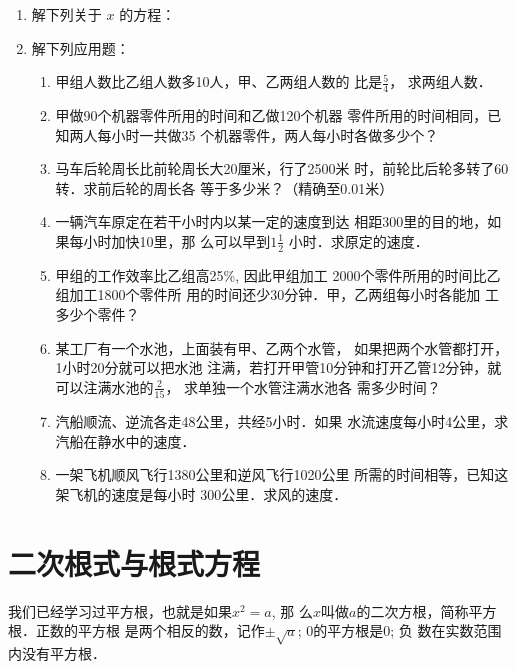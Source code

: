 \begin{enumerate}
\item 解下列关于 $x$ 的方程：
\begin{enumerate}
\end{enumerate}

\item 解下列应用题：
\begin{enumerate}
\item 甲组人数比乙组人数多10人，甲、乙两组人数的
比是$\frac{5}{4}$，
求两组人数．
\item 甲做90个机器零件所用的时间和乙做120个机器
零件所用的时间相同，已知两人每小时一共做35
个机器零件，两人每小时各做多少个？
\item 马车后轮周长比前轮周长大20厘米，行了2500米
时，前轮比后轮多转了60转．求前后轮的周长各
等于多少米？（精确至0.01米）
\item 一辆汽车原定在若干小时内以某一定的速度到达
相距300里的目的地，如果每小时加快10里，那
么可以早到$1\frac{1}{2}$
小时．求原定的速度．
\item 甲组的工作效率比乙组高25\%, 因此甲组加工
2000个零件所用的时间比乙组加工1800个零件所
用的时间还少30分钟．甲，乙两组每小时各能加
工多少个零件？
\item 某工厂有一个水池，上面装有甲、乙两个水管，
如果把两个水管都打开，1小时20分就可以把水池
注满，若打开甲管10分钟和打开乙管12分钟，就
可以注满水池的$\frac{2}{15}$，
求单独一个水管注满水池各
需多少时间？
\item 汽船顺流、逆流各走48公里，共经5小时．如果
水流速度每小时4公里，求汽船在静水中的速度．
\item 一架飞机顺风飞行1380公里和逆风飞行1020公里
所需的时间相等，已知这架飞机的速度是每小时
300公里．求风的速度．
\end{enumerate}
\end{enumerate}

\section{二次根式与根式方程}
我们已经学习过平方根，也就是如果$x^2=a$, 那
么$x$叫做$a$的二次方根，简称平方根．正数的平方根
是两个相反的数，记作$\pm\sqrt{a}$; 0的平方根是0; 负
数在实数范围内没有平方根．

